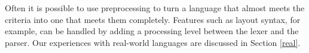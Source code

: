 Often it is possible to use preprocessing to turn a language that almost
meets the criteria into one that meets them completely. Features such as
layout syntax, for example, can be handled by adding a processing level
between the lexer and the parser. Our experiences with real-world
languages are discussed in Section \ref{real}.







